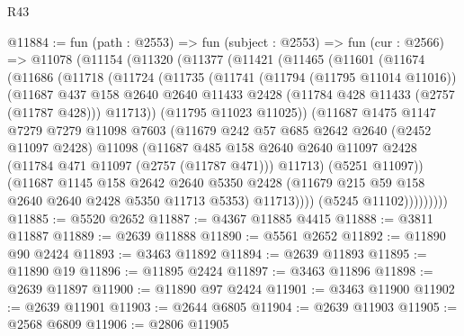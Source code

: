 \begin{lexlean}{R43}
\begin{coremodule}
@11884 := fun (path : @2553) =>
  fun (subject : @2553) =>
  fun (cur : @2566) =>
  @11078
    (@11154
      (@11320
        (@11377
          (@11421
            (@11465
              (@11601
                (@11674
                  (@11686
                    (@11718
                      (@11724
                        (@11735
                          (@11741
                            (@11794 (@11795 @11014 @11016))
                            (@11687
                              @437
                              @158
                              @2640
                              @2640
                              @11433
                              @2428
                              (@11784 @428 @11433 (@2757 (@11787 @428)))
                              @11713))
                          (@11795 @11023 @11025))
                        (@11687
                          @1475
                          @1147
                          @7279
                          @7279
                          @11098
                          @7603
                          (@11679
                            @242
                            @57
                            @685
                            @2642
                            @2640
                            (@2452 @11097 @2428)
                            @11098
                            (@11687
                              @485
                              @158
                              @2640
                              @2640
                              @11097
                              @2428
                              (@11784 @471 @11097 (@2757 (@11787 @471)))
                              @11713)
                            (@5251 @11097))
                          (@11687
                            @1145
                            @158
                            @2642
                            @2640
                            @5350
                            @2428
                            (@11679 @215 @59 @158 @2640 @2640 @2428 @5350 @11713 @5353)
                            @11713))))
                    (@5245 @11102)))))))))
@11885 := @5520 @2652
@11887 := @4367 @11885 @4415
@11888 := @3811 @11887
@11889 := @2639 @11888
@11890 := @5561 @2652
@11892 := @11890 @90 @2424
@11893 := @3463 @11892
@11894 := @2639 @11893
@11895 := @11890 @19
@11896 := @11895 @2424
@11897 := @3463 @11896
@11898 := @2639 @11897
@11900 := @11890 @97 @2424
@11901 := @3463 @11900
@11902 := @2639 @11901
@11903 := @2644 @6805
@11904 := @2639 @11903
@11905 := @2568 @6809
@11906 := @2806 @11905

\end{coremodule}
\end{lexlean}
